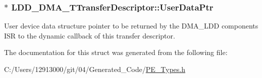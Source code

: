 \subsubsection[{User\+Data\+Ptr}]{$\ast$ L\+D\+D\+\_\+\+D\+M\+A\+\_\+\+T\+Transfer\+Descriptor\+::\+User\+Data\+Ptr}\label{struct_l_d_d___d_m_a___t_transfer_descriptor_a4136d6742944c7b04a94695c78b581b8}
User device data structure pointer to be returned by the D\+M\+A\+\_\+\+L\+D\+D component\textquotesingle{}s I\+S\+R to the dynamic callback of this transfer descriptor. 

The documentation for this struct was generated from the following file\+:\begin{DoxyCompactItemize}
\item 
C\+:/\+Users/12913000/git/04/\+Generated\+\_\+\+Code/\hyperlink{_p_e___types_8h}{P\+E\+\_\+\+Types.\+h}\end{DoxyCompactItemize}
